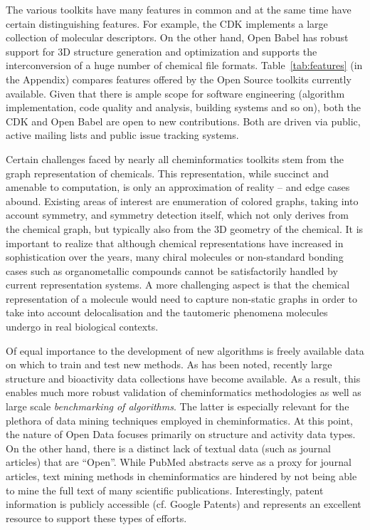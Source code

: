 \documentclass{../sig-alternate}
\begin{document}
The various toolkits have many features in common and at the same time
have certain distinguishing features. For example, the CDK implements
a large collection of molecular descriptors. On the other hand, Open
Babel has robust support for 3D structure generation and optimization
and supports the interconversion of a huge number of chemical file
formats. Table~\ref{tab:features} (in the Appendix) compares features
offered by the Open Source toolkits currently available.  Given that
there is ample scope for software engineering (algorithm
implementation, code quality and analysis, building systems and so on), both
the CDK and Open Babel are open to new contributions. Both are driven
via public, active mailing lists and public issue tracking systems.

Certain challenges faced by nearly all cheminformatics toolkits stem
from the graph representation of chemicals. This representation, while
succinct and amenable to computation, is only an approximation of
reality -- and edge cases abound. Existing areas of interest are
enumeration of colored graphs, taking into account symmetry, and
symmetry detection itself, which not only derives from the chemical
graph, but typically also from the 3D geometry of the chemical. It is
important to realize that although chemical representations have
increased in sophistication over the years, many chiral molecules or
non-standard bonding cases such as organometallic compounds cannot be
satisfactorily handled by current representation systems. A more
challenging aspect is that the chemical representation of a molecule
would need to capture non-static graphs in order to take into
account delocalisation and the tautomeric phenomena molecules undergo
in real biological contexts.

Of equal importance to the development of new algorithms is freely
available data on which to train and test new methods. As has been
noted, recently large structure and bioactivity data collections have
become available. As a result, this enables much more robust
validation of cheminformatics methodologies as well as large scale
\emph{benchmarking of algorithms}. The latter is especially relevant
for the plethora of data mining techniques employed in
cheminformatics. At this point, the nature of Open Data focuses
primarily on structure and activity data types. On the other hand,
there is a distinct lack of textual data (such as journal articles)
that are ``Open''. While PubMed abstracts serve as a proxy
for journal articles, text mining methods in cheminformatics are
hindered by not being able to mine the full text of many scientific
publications.  Interestingly, patent information is publicly
accessible (cf. Google Patents) and represents an excellent resource
to support these types of efforts.
\end{document}

